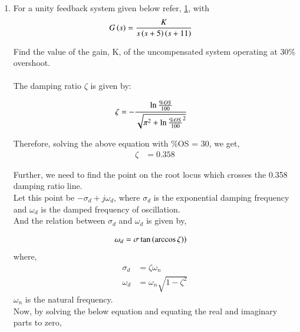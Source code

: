 \begin{enumerate}[label=\thesection.\arabic*.,ref=\thesection.\theenumi]

\item For a unity feedback system given below refer, \ref{fig:ep18btech11016_block}, with
\begin{align}
    G\brak{s} &= \frac{K}{s\brak{s+5}\brak{s+11}}
    \label{eq:ep18btech11016_system}
\end{align}

\begin{figure}[h]
 \centering
    \resizebox{\columnwidth}{!}{}
    \caption{}
    \label{fig:ep18btech11016_block}
\end{figure}

Find the value of the gain, K, of the uncompensated system operating at 30\% overshoot.\\

\solution\\ The damping ratio $\zeta$ is given by:

\begin{align}
    \zeta &= -\cfrac{\ln{\frac{\%OS}{100}}}{\sqrt{\pi^2 + \ln{\frac{\%OS}{100}}^2}}
    \label{eq:ep18btech11016_zeta}
\end{align}

Therefore, solving the above equation with \%OS = 30, we get,
\begin{align}
    \zeta &= 0.358
\end{align}

Further, we need to find the point on the root locus which crosses the 0.358 damping ratio line.\\
Let this point be $-\sigma_d + j\omega_d$, where $\sigma_d$ is the exponential damping frequency and $\omega_d$ is the damped frequency of oscillation.\\
And the relation between $\sigma_d$ and $\omega_d$ is given by,

\begin{align}
    \omega_d &= \sigma\tan\left(\arccos{\zeta})\right)
\end{align}
where, 
\begin{align}
    \sigma_d &= \zeta\omega_n\\
    \omega_d &= \omega_n\sqrt{1-\zeta^2}
\end{align}
$\omega_n$ is the natural frequency.\\

Now, by solving the below equation and equating the real and imaginary parts to zero,


\end{enumerate}
